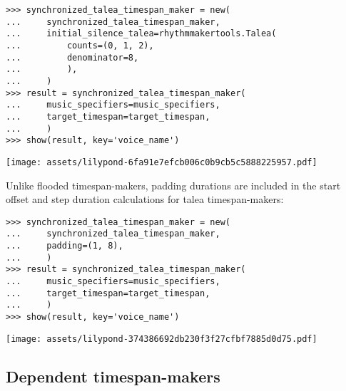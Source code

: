 \begin{abjadbookoutput}
\begin{singlespacing}
\vspace{-0.5\baselineskip}
\begin{lstlisting}
>>> synchronized_talea_timespan_maker = new(
...     synchronized_talea_timespan_maker,
...     initial_silence_talea=rhythmmakertools.Talea(
...         counts=(0, 1, 2),
...         denominator=8,
...         ),
...     )
>>> result = synchronized_talea_timespan_maker(
...     music_specifiers=music_specifiers,
...     target_timespan=target_timespan,
...     )
>>> show(result, key='voice_name')
\end{lstlisting}
\noindent\texttt{[image: assets/lilypond-6fa91e7efcb006c0b9cb5c5888225957.pdf]}
\end{singlespacing}
\end{abjadbookoutput}


\noindent Unlike flooded timespan-makers, padding durations are included in the
start offset and step duration calculations for talea timespan-makers:

\begin{comment}
<abjad>
synchronized_talea_timespan_maker = new(
    synchronized_talea_timespan_maker,
    padding=(1, 8),
    )
result = synchronized_talea_timespan_maker(
    music_specifiers=music_specifiers,
    target_timespan=target_timespan,
    )
show(result, key='voice_name')
</abjad>
\end{comment}

\begin{abjadbookoutput}
\begin{singlespacing}
\vspace{-0.5\baselineskip}
\begin{lstlisting}
>>> synchronized_talea_timespan_maker = new(
...     synchronized_talea_timespan_maker,
...     padding=(1, 8),
...     )
>>> result = synchronized_talea_timespan_maker(
...     music_specifiers=music_specifiers,
...     target_timespan=target_timespan,
...     )
>>> show(result, key='voice_name')
\end{lstlisting}
\noindent\texttt{[image: assets/lilypond-374386692db230f3f27cfbf7885d0d75.pdf]}
\end{singlespacing}
\end{abjadbookoutput}

\subsection{Dependent timespan-makers} %
\label{ssec:dependent-timespan-makers}

